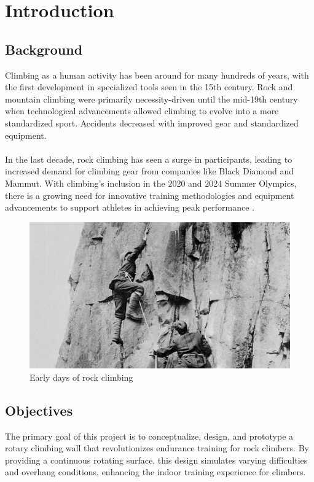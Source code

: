 \chapter{Introduction}

\section{Background}
Climbing as a human activity has been around for many hundreds of years, with the first development in specialized tools seen in the 15th century. Rock and mountain climbing were primarily necessity-driven until the mid-19th century when technological advancements allowed climbing to evolve into a more standardized sport. Accidents decreased with improved gear and standardized equipment. \\\\
In the last decade, rock climbing has seen a surge in participants, leading to increased demand for climbing gear from companies like Black Diamond and Mammut. With climbing’s inclusion in the 2020 and 2024 Summer Olympics, there is a growing need for innovative training methodologies and equipment advancements to support athletes in achieving peak performance \citep{Consuegra-2023}.

\begin{figure}[ht]
    \centering
    \includegraphics[width=0.75\linewidth]{figs/early-climbing.jpg}
    \caption{Early days of rock climbing}
\end{figure}

\section{Objectives}
The primary goal of this project is to conceptualize, design, and prototype a rotary climbing wall that revolutionizes endurance training for rock climbers. By providing a continuous rotating surface, this design simulates varying difficulties and overhang conditions, enhancing the indoor training experience for climbers.

